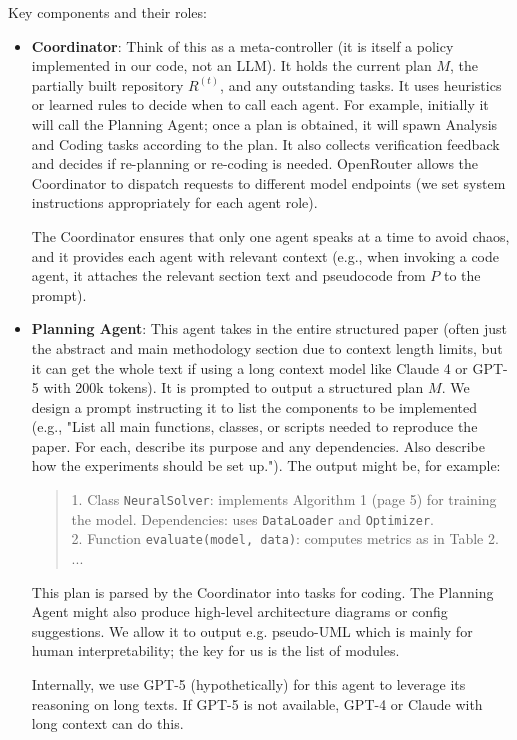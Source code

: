 \documentclass{ieeeaccess}
\begin{document}
Key components and their roles:
\begin{itemize}
\item \textbf{Coordinator}: Think of this as a meta-controller (it is itself a policy implemented in our code, not an LLM). It holds the current plan $M$, the partially built repository $R^{(t)}$, and any outstanding tasks. It uses heuristics or learned rules to decide when to call each agent. For example, initially it will call the Planning Agent; once a plan is obtained, it will spawn Analysis and Coding tasks according to the plan. It also collects verification feedback and decides if re-planning or re-coding is needed. OpenRouter allows the Coordinator to dispatch requests to different model endpoints (we set system instructions appropriately for each agent role).

The Coordinator ensures that only one agent speaks at a time to avoid chaos, and it provides each agent with relevant context (e.g., when invoking a code agent, it attaches the relevant section text and pseudocode from $P$ to the prompt).

\item \textbf{Planning Agent}: This agent takes in the entire structured paper (often just the abstract and main methodology section due to context length limits, but it can get the whole text if using a long context model like Claude 4 or GPT-5 with 200k tokens). It is prompted to output a structured plan $M$. We design a prompt instructing it to list the components to be implemented (e.g., "List all main functions, classes, or scripts needed to reproduce the paper. For each, describe its purpose and any dependencies. Also describe how the experiments should be set up."). The output might be, for example:
\begin{quote}\footnotesize
1. Class \texttt{NeuralSolver}: implements Algorithm 1 (page 5) for training the model. Dependencies: uses \texttt{DataLoader} and \texttt{Optimizer}.\\
2. Function \texttt{evaluate(model, data)}: computes metrics as in Table 2. ...
\end{quote}
This plan is parsed by the Coordinator into tasks for coding. The Planning Agent might also produce high-level architecture diagrams or config suggestions. We allow it to output e.g. pseudo-UML which is mainly for human interpretability; the key for us is the list of modules.

Internally, we use GPT-5 (hypothetically) for this agent to leverage its reasoning on long texts. If GPT-5 is not available, GPT-4 or Claude with long context can do this.


\end{itemize}
\end{document}
